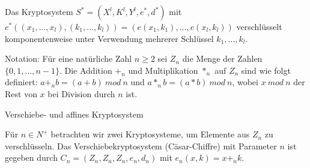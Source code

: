 \documentclass[10pt, a4paper]{exam}
\begin{document}
\begin{questions}
  Das Kryptosystem $S^*=(X^l,K^l,Y^l,e^*,d^*)$ mit $e^*((x_1,...,x_l),(k_1,...,k_l))=(e(x_1,k_1),..., e(x_l,k_l))$ verschlüsselt komponentenweise unter Verwendung mehrerer Schlüssel $k_1,...,k_l$.

  Notation: Für eine natürliche Zahl $n\geq 2$ sei $Z_n$ die Menge der Zahlen $\{0,1,...,n-1\}$. Die Addition $+_n$ und Multiplikation $*_n$ auf $Z_n$ sind wie folgt definiert:  $a +_n b =(a+b)\ mod\ n$ und $a *_n b =(a*b)\ mod\ n$, wobei $x\ mod\ n$ der Rest von $x$ bei Division durch $n$ ist.

  \question Verschiebe- und affines Kryptosystem

  Für $n\in N^+$ betrachten wir zwei Kryptosysteme, um Elemente aus $Z_n$ zu verschlüsseln.
  Das Verschiebekryptosystem (Cäsar-Chiffre) mit Parameter $n$ ist gegeben durch $C_n=(Z_n,Z_n,Z_n,e_n,d_n)$ mit $e_n(x,k)=x +_n k$.


\end{questions}
\end{document}
